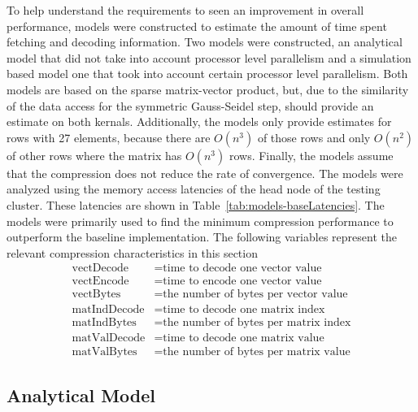 
To help understand the requirements to seen an improvement in overall performance, models were constructed to estimate the amount of time spent fetching and decoding information.
Two models were constructed, an analytical model that did not take into account processor level parallelism and a simulation based model one that took into account certain processor level parallelism.
Both models are based on the sparse matrix-vector product, but, due to the similarity of the data access for the symmetric Gauss-Seidel step, should provide an estimate on both kernals.
Additionally, the models only provide estimates for rows with 27 elements, because there are \(O(n^3)\) of those rows and only \(O(n^2)\) of other rows where the matrix has \(O(n^3)\) rows.
Finally, the models assume that the compression does not reduce the rate of convergence.
The models were analyzed using the memory access latencies of the head node of the testing cluster.
These latencies are shown in Table~\ref{tab:models-baseLatencies}.
The models were primarily used to find the minimum compression performance to outperform the baseline implementation.
The following variables represent the relevant compression characteristics in this section
\begin{align*}
	\mathrm{vectDecode} &= \text{time to decode one vector value} \\
	\mathrm{vectEncode}  &= \text{time to encode one vector value} \\
	\mathrm{vectBytes} &= \text{the number of bytes per vector value} \\
	\mathrm{matIndDecode} &= \text{time to decode one matrix index} \\
	\mathrm{matIndBytes} &= \text{the number of bytes per matrix index} \\
	\mathrm{matValDecode} &= \text{time to decode one matrix value} \\
	\mathrm{matValBytes} &= \text{the number of bytes per matrix value}
\end{align*}



\subsection{Analytical Model}

